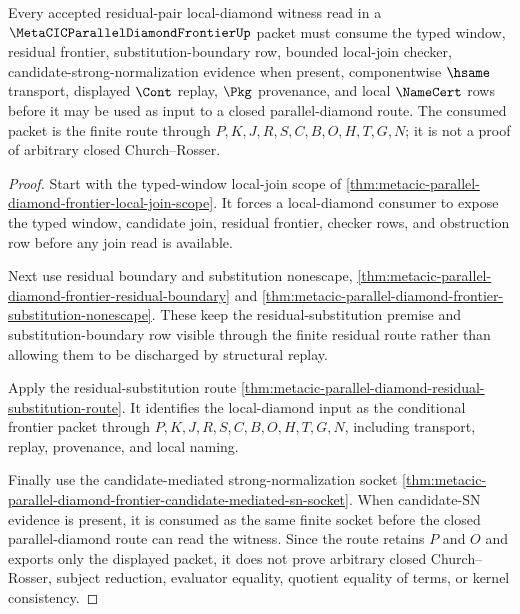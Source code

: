 \begin{theorem}
\label{thm:metacic-parallel-diamond-frontier-finite-residual-witness-consumption}
Every accepted residual-pair local-diamond witness read in a $\MetaCICParallelDiamondFrontierUp$ packet must consume the typed window, residual frontier, substitution-boundary row, bounded local-join checker, candidate-strong-normalization evidence when present, componentwise $\hsame$ transport, displayed $\Cont$ replay, $\Pkg$ provenance, and local $\NameCert$ rows before it may be used as input to a closed parallel-diamond route. The consumed packet is the finite route through $P,K,J,R,S,C,B,O,H,T,G,N$; it is not a proof of arbitrary closed Church--Rosser.
\end{theorem}
\begin{proof}
Start with the typed-window local-join scope of \autoref{thm:metacic-parallel-diamond-frontier-local-join-scope}. It forces a local-diamond consumer to expose the typed window, candidate join, residual frontier, checker rows, and obstruction row before any join read is available.

Next use residual boundary and substitution nonescape, \autoref{thm:metacic-parallel-diamond-frontier-residual-boundary} and \autoref{thm:metacic-parallel-diamond-frontier-substitution-nonescape}. These keep the residual-substitution premise and substitution-boundary row visible through the finite residual route rather than allowing them to be discharged by structural replay.

Apply the residual-substitution route \autoref{thm:metacic-parallel-diamond-residual-substitution-route}. It identifies the local-diamond input as the conditional frontier packet through $P,K,J,R,S,C,B,O,H,T,G,N$, including transport, replay, provenance, and local naming.

Finally use the candidate-mediated strong-normalization socket \autoref{thm:metacic-parallel-diamond-frontier-candidate-mediated-sn-socket}. When candidate-SN evidence is present, it is consumed as the same finite socket before the closed parallel-diamond route can read the witness. Since the route retains $P$ and $O$ and exports only the displayed packet, it does not prove arbitrary closed Church--Rosser, subject reduction, evaluator equality, quotient equality of terms, or kernel consistency.
\end{proof}

